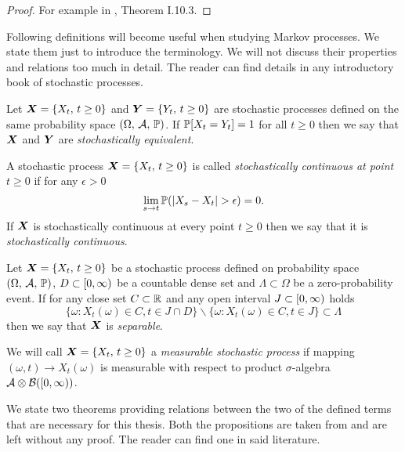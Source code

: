 \begin{proof}
	For example in \cite{Stepan87}, Theorem I.10.3.
\end{proof}

Following definitions will become useful when studying Markov processes. We state them just to introduce the terminology. We will not discuss their properties and relations too much in detail. The reader can find details in any introductory book of stochastic processes.

\begin{definition}\label{stochEquiv}
	Let $\bm{X} = \{ X_t ,\, t \geq 0 \}$ and $\bm{Y} = \{ Y_t ,\, t \geq 0 \}$ are stochastic processes defined on the same probability space $(\Omega ,\, \mathcal{A} ,\, \operatorname{\mathbb{P}})$. If $\operatorname{\mathbb{P}} [X_t = Y_t] = 1$ for all $t \geq 0$ then we say that $\bm{X}$ and $\bm{Y}$ are \emph{stochastically equivalent}.
\end{definition}

\begin{definition}\label{stochCont}
	A stochastic process $\bm{X} = \{ X_t ,\, t \geq 0 \}$ is called \emph{stochastically continuous at point} $t \geq 0$ if for any $\epsilon > 0$
	\[
		\lim_{s \to t} \operatorname{\mathbb{P}} (\vert X_s - X_t \vert > \epsilon ) = 0.
	\]
	If $\bm{X}$ is stochastically continuous at every point $t \geq 0$ then we say that it is \emph{stochastically continuous}.
\end{definition}

\begin{definition}\label{separProc}
	Let $\bm{X} = \{ X_t ,\, t \geq 0 \}$ be a stochastic process defined on probability space $(\Omega ,\, \mathcal{A} ,\, \operatorname{\mathbb{P}})$, $D \subset [0, \infty)$ be a countable dense set and $\Lambda \subset \Omega$ be a zero-probability event. If for any close set $C \subset \mathbb{R}$ and any open interval $J \subset [0, \infty)$ holds
	\[
		\{ \omega: X_t(\omega) \in C, t \in J \cap D \}
		\backslash
		\{ \omega: X_t(\omega) \in C, t \in J \}
		\subset \Lambda
	\]
	then we say that $\bm{X}$ is \emph{separable}.
\end{definition}

\begin{definition}\label{measurProc}
	We will call $\bm{X} = \{ X_t ,\, t \geq 0 \}$ a \emph{measurable stochastic process} if mapping $(\omega, t) \to X_t(\omega)$ is measurable with respect to product $\sigma$-algebra $\mathcal{A} \otimes \mathcal{B}([0, \infty))$.
\end{definition}

We state two theorems providing relations between the two of the defined terms that are necessary for this thesis. Both the propositions are taken from \cite{Doob90} and are left without any proof. The reader can find one in said literature.

